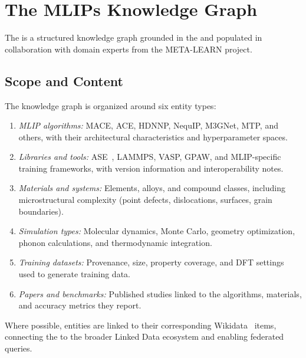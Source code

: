 \section{The MLIPs Knowledge Graph}
\label{sec:kg}

The \MLIPsKG{} is a structured knowledge graph grounded in the \MLIPsOntology{}
and populated in collaboration with domain experts from the META-LEARN project.

\subsection{Scope and Content}

The knowledge graph is organized around six entity types:

\begin{enumerate}
\item \emph{MLIP algorithms:} MACE, ACE, HDNNP, NequIP, M3GNet, MTP, and
  others, with their architectural characteristics and hyperparameter spaces.

\item \emph{Libraries and tools:} ASE~\cite{larsen2017ase}, LAMMPS, VASP,
  GPAW, and MLIP-specific training frameworks, with version information and
  interoperability notes.

\item \emph{Materials and systems:} Elements, alloys, and compound classes,
  including microstructural complexity (point defects, dislocations, surfaces,
  grain boundaries).

\item \emph{Simulation types:} Molecular dynamics, Monte Carlo, geometry
  optimization, phonon calculations, and thermodynamic integration.

\item \emph{Training datasets:} Provenance, size, property coverage, and DFT
  settings used to generate training data.

\item \emph{Papers and benchmarks:} Published studies linked to the
  algorithms, materials, and accuracy metrics they report.
\end{enumerate}

Where possible, entities are linked to their corresponding
Wikidata~\cite{vrandecic2014wikidata} items, connecting the \MLIPsKG{} to the
broader Linked Data ecosystem and enabling federated queries.


